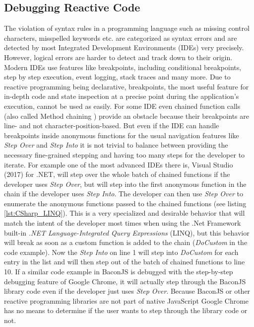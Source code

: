 \subsection{Debugging Reactive Code}
The violation of syntax rules in a programming language such as missing control characters, misspelled keywords etc. are categorized as syntax errors and are detected by most Integrated Development Environments (IDEs) very precisely. However, logical errors are harder to detect and track down to their origin. Modern IDEs use features like breakpoints, including conditional breakpoints, step by step execution, event logging, stack traces and many more. Due to reactive programming being declarative, breakpoints, the most useful feature for in-depth code and state inspection at a precise point during the application's execution, cannot be used as easily. For some IDE even chained function calls (also called Method chaining \cite{MethodChaining}) provide an obstacle because their breakpoints are line- and not character-position-based. But even if the IDE can handle breakpoints inside anonymous functions for the usual navigation features like \emph{Step Over} and \emph{Step Into} it is not trivial to balance between providing the necessary fine-grained stepping and having too many steps for the developer to iterate. For example one of the most advanced IDEs there is, Visual Studio (2017) for .NET, will step over the whole batch of chained functions if the developer uses \emph{Step Over}, but will step into the first anonymous function in the chain if the developer uses \emph{Step Into}. The developer can then use \emph{Step Over} to enumerate the anonymous functions passed to the chained functions (see listing \ref{lst:CSharp_LINQ}). This is a very specialized and desirable behavior that will match the intent of the developer most times when using the .Net Framework built-in \emph{.NET Language-Integrated Query Expressions} (LINQ), but this behavior will break as soon as a custom function is added to the chain (\emph{DoCustom} in the code example). Now the \emph{Step Into} on line 1 will step into \emph{DoCustom} for each entry in the list and will then step out of the batch of chained functions to line 10. If a similar code example in BaconJS is debugged with the step-by-step debugging feature of Google Chrome, it will actually step through the BaconJS library code even if the developer just uses \emph{Step Over}. Because BaconJS or other reactive programming libraries are not part of native JavaScript Google Chrome has no means to determine if the user wants to step through the library code or not.
